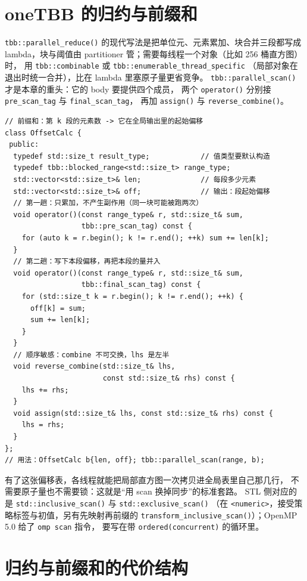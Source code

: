 \documentclass[12pt,a4paper,fontset=fandol]{ctexbook}
\newcommand{\Fn}[1]{\texttt{#1()}}
\newcommand{\Tp}[1]{\texttt{#1}}
\begin{document}
\section{oneTBB 的归约与前缀和}

\Fn{tbb::parallel\_reduce} 的现代写法是把单位元、元素累加、块合并三段都写成
lambda，块与阈值由 partitioner 管；需要每线程一个对象（比如 256 桶直方图）时，
用 \Tp{tbb::combinable} 或 \Tp{tbb::enumerable\_thread\_specific}
（局部对象在退出时统一合并），比在 lambda 里塞原子量更省竞争。
\Fn{tbb::parallel\_scan} 才是本章的重头：它的 body 要提供四个成员，
两个 \Tp{operator()} 分别接 \Tp{pre\_scan\_tag} 与 \Tp{final\_scan\_tag}，
再加 \Fn{assign} 与 \Fn{reverse\_combine}。
\begin{lstlisting}[style=cppstyle,caption={parallel\_scan：算出每段在扁平输出里的写入偏移}]
// 前缀和：第 k 段的元素数 -> 它在全局输出里的起始偏移
class OffsetCalc {
 public:
  typedef std::size_t result_type;            // 值类型要默认构造
  typedef tbb::blocked_range<std::size_t> range_type;
  std::vector<std::size_t>& len;              // 每段多少元素
  std::vector<std::size_t>& off;              // 输出：段起始偏移
  // 第一趟：只累加，不产生副作用（同一块可能被跑两次）
  void operator()(const range_type& r, std::size_t& sum,
                  tbb::pre_scan_tag) const {
    for (auto k = r.begin(); k != r.end(); ++k) sum += len[k];
  }
  // 第二趟：写下本段偏移，再把本段的量并入
  void operator()(const range_type& r, std::size_t& sum,
                  tbb::final_scan_tag) const {
    for (std::size_t k = r.begin(); k != r.end(); ++k) {
      off[k] = sum;
      sum += len[k];
    }
  }
  // 顺序敏感：combine 不可交换，lhs 是左半
  void reverse_combine(std::size_t& lhs,
                       const std::size_t& rhs) const {
    lhs += rhs;
  }
  void assign(std::size_t& lhs, const std::size_t& rhs) const {
    lhs = rhs;
  }
};
// 用法：OffsetCalc b{len, off}; tbb::parallel_scan(range, b);
\end{lstlisting}

有了这张偏移表，各线程就能把局部直方图一次拷贝进全局表里自己那几行，
不需要原子量也不需要锁：这就是``用 scan 换掉同步''的标准套路。
STL 侧对应的是 \Fn{std::inclusive\_scan} 与 \Fn{std::exclusive\_scan}
（在 \Tp{<numeric>}，接受策略标签与初值，另有先映射再前缀的
\Fn{transform\_inclusive\_scan}）；OpenMP 5.0 给了 \Tp{omp scan} 指令，
要写在带 \Tp{ordered(concurrent)} 的循环里。

\section{归约与前缀和的代价结构}
\end{document}
